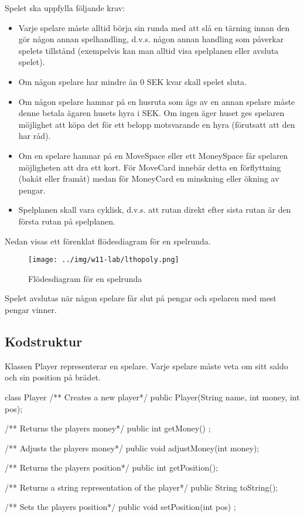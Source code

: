 Spelet ska uppfylla följande krav:

\begin{itemize}

\item Varje spelare måste alltid börja sin runda med att slå en tärning innan den gör någon annan spelhandling, d.v.s. någon annan handling som påverkar spelets tillstånd (exempelvis kan man alltid visa spelplanen eller avsluta spelet).
\item Om någon spelare har mindre än 0 SEK kvar skall spelet sluta.
\item Om någon spelare hamnar på en husruta som ägs av en annan spelare måste denne betala ägaren husets hyra i SEK. Om ingen äger huset ges spelaren möjlighet att köpa det för ett belopp motsvarande en hyra (förutsatt att den har råd).
\item Om en spelare hamnar på en MoveSpace eller ett MoneySpace får spelaren möjligheten att dra ett kort. För MoveCard innebär detta en förflyttning (bakåt eller framåt) medan för MoneyCard en minskning eller ökning av pengar.
\item Spelplanen skall vara cyklisk, d.v.s. att rutan direkt efter sista rutan är den första rutan på spelplanen.
\end{itemize}

Nedan visas ett förenklat flödesdiagram för en spelrunda.

\begin{figure}[H]
\centering
\texttt{[image: ../img/w11-lab/lthopoly.png]}
\caption { Flödesdiagram för en spelrunda}
\label{fig:scalajava:lthopoly-team:flowchart}
\end{figure}

Spelet avslutas när någon spelare får slut på pengar och spelaren med mest pengar vinner.

\subsection{Kodstruktur}

Klassen Player representerar en spelare. Varje spelare måste veta om sitt saldo och sin position på brädet.

\begin{JavaSpec}{class Player}
	/** Creates a new player*/
	public Player(String name, int money, int pos);

	/** Returns the players money*/
	public int getMoney() ;

	/** Adjusts the players money*/
	public void adjustMoney(int money);

	/** Returns the players position*/
	public int getPosition();

	/** Returns a string representation of the player*/
	public String toString();

	/** Sets the players position*/
	public void setPosition(int pos) ;

\end{JavaSpec}

